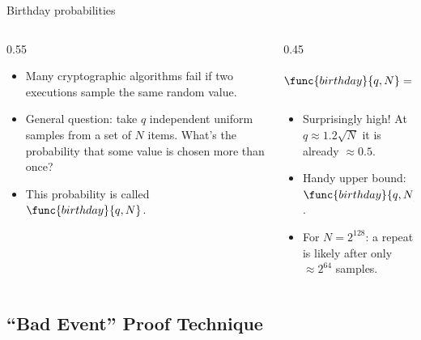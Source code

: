 \ifdefined\PRESENTATION\else\PassOptionsToClass{handout}{beamer}\fi\documentclass[aspectratio=169, lualatex]{beamer}
\begin{document}
\begin{frame}{Birthday probabilities}
	\begin{columns}[c]
		\begin{column}{0.55\textwidth}
			\begin{itemize}
				\item Many cryptographic algorithms fail if two executions sample the same random value.
				\item General question: take $q$ independent uniform samples from a set of $N$ items. What's the probability that some value is chosen more than once?
				\item This probability is called $\func{birthday}{q,N}$.
			\end{itemize}
		\end{column}
		\begin{column}{0.45\textwidth}
			\begin{align*}
				\func{birthday}{q,N} = 1 - \prod_{i=1}^{q-1} \left(1 - \frac{i}{N}\right)
			\end{align*}
			\begin{itemize}
				\item Surprisingly high! At $q \approx 1.2\sqrt{N}$ it is already $\approx 0.5$.
				\item Handy upper bound: $\func{birthday}{q,N} \leq q(q-1)/2N \leq q^2/2N$.
				\item For $N = 2^{128}$: a repeat is likely after only $\approx 2^{64}$ samples.
			\end{itemize}
		\end{column}
	\end{columns}
\end{frame}

\subsection{``Bad Event'' Proof Technique}
\end{document}
